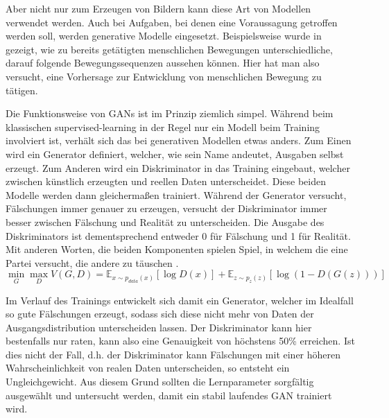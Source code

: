\documentclass{hsflensburg}
\begin{document}
  Aber nicht nur zum Erzeugen von Bildern kann diese Art von Modellen verwendet
  werden. Auch bei Aufgaben, bei denen eine Voraussagung getroffen werden soll,
  werden generative Modelle eingesetzt. Beispielsweise wurde in
  \cite{barsoum2017hpgan} gezeigt, wie zu bereits getätigten menschlichen
  Bewegungen unterschiedliche, darauf folgende Bewegungssequenzen aussehen
  können. Hier hat man also versucht, eine Vorhersage zur Entwicklung von
  menschlichen Bewegung zu tätigen.

  Die Funktionsweise von GANs ist im Prinzip ziemlich simpel. Während beim
  klassischen supervised-learning in der Regel nur ein Modell beim Training
  involviert ist, verhält sich das bei generativen Modellen etwas anders. Zum
  Einen wird ein Generator definiert, welcher, wie sein Name andeutet, Ausgaben
  selbst erzeugt. Zum Anderen wird ein Diskriminator in das Training eingebaut,
  welcher zwischen künstlich erzeugten und reellen Daten unterscheidet. Diese
  beiden Modelle werden dann gleichermaßen trainiert. Während der Generator
  versucht, Fälschungen immer genauer zu erzeugen, versucht der Diskriminator
  immer besser zwischen Fälschung und Realität zu unterscheiden. Die
  Ausgabe des Diskriminators ist dementsprechend entweder 0 für Fälschung und 1
  für Realität. Mit anderen Worten, die beiden Komponenten spielen Spiel, in
  welchem die eine Partei versucht, die andere zu täuschen
  \cite{goodfellow2014generative}.
  \[
    \min_G \max_D V(G, D) = \mathbb{E}_{x \sim p_{data}(x)}\left[ \log D(x) \right] + \mathbb{E}_{z \sim p_z(z)}\left[ \log (1 - D(G(z))) \right]
  \]

  Im Verlauf des Trainings entwickelt sich damit ein Generator, welcher im
  Idealfall so gute Fälschungen erzeugt, sodass sich diese nicht mehr von Daten
  der Ausgangsdistribution unterscheiden lassen. Der Diskriminator kann hier
  bestenfalls nur raten, kann also eine Genauigkeit von höchstens 50\%
  erreichen. Ist dies nicht der Fall, d.h. der Diskriminator kann Fälschungen
  mit einer höheren Wahrscheinlichkeit von realen Daten unterscheiden, so
  entsteht ein Ungleichgewicht. Aus diesem Grund sollten die Lernparameter
  sorgfältig ausgewählt und untersucht werden, damit ein stabil laufendes GAN
  trainiert wird.
  
\end{document}
